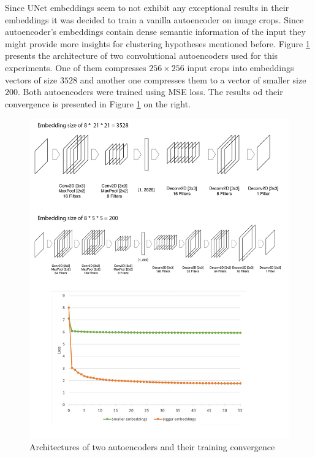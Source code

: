 Since UNet embeddings seem to not exhibit any exceptional results in their embeddings it was decided to train a vanilla autoencoder on image crops. Since autoencoder's embeddings contain dense semantic information of the input they might provide more insights for clustering hypotheses mentioned before. Figure \ref{fig:ae-training} presents the architecture of two convolutional autoencoders used for this experiments. One of them compresses $256 \times 256$ input crops into embeddings vectors of size $3528$ and another one compresses them to a vector of smaller size $200$. Both autoencoders were trained using MSE loss. The results od their convergence is presented in Figure \ref{fig:ae-training} on the right.

\begin{figure}[H]
	\begin{center}
		\includegraphics[width=\linewidth]{bilder/ae-embeddings/training-architectures.png}
		\caption{Architectures of two autoencoders and their training convergence}\label{fig:ae-training}
	\end{center}
\end{figure}

